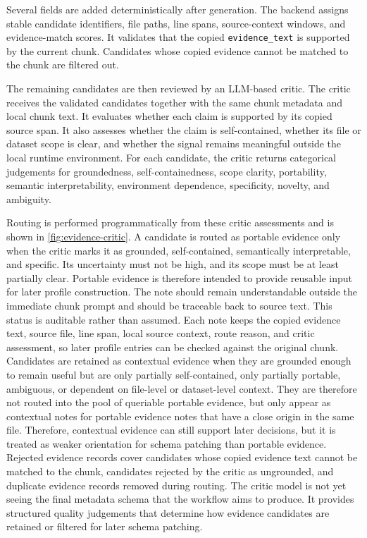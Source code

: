 Several fields are added deterministically after generation.
The backend assigns stable candidate identifiers, file paths, line spans, source-context windows, and evidence-match scores.
It validates that the copied \texttt{evidence\_text} is supported by the current chunk.
Candidates whose copied evidence cannot be matched to the chunk are filtered out.

The remaining candidates are then reviewed by an \ac{LLM}-based critic.
The critic receives the validated candidates together with the same chunk metadata and local chunk text.
It evaluates whether each claim is supported by its copied source span.
It also assesses whether the claim is self-contained, whether its file or dataset scope is clear, and whether the signal remains meaningful outside the local runtime environment.
For each candidate, the critic returns categorical judgements for groundedness, self-containedness, scope clarity, portability, semantic interpretability, environment dependence, specificity, novelty, and ambiguity.

Routing is performed programmatically from these critic assessments and is shown in \cref{fig:evidence-critic}.
A candidate is routed as portable evidence only when the critic marks it as grounded, self-contained, semantically interpretable, and specific.
Its uncertainty must not be high, and its scope must be at least partially clear.
Portable evidence is therefore intended to provide reusable input for later profile construction.
The note should remain understandable outside the immediate chunk prompt and should be traceable back to source text.
This status is auditable rather than assumed.
Each note keeps the copied evidence text, source file, line span, local source context, route reason, and critic assessment, so later profile entries can be checked against the original chunk.
Candidates are retained as contextual evidence when they are grounded enough to remain useful but are only partially self-contained, only partially portable, ambiguous, or dependent on file-level or dataset-level context.
They are therefore not routed into the pool of queriable portable evidence, but only appear as contextual notes for portable evidence notes that have a close origin in the same file.
Therefore, contextual evidence can still support later decisions, but it is treated as weaker orientation for schema patching than portable evidence.
Rejected evidence records cover candidates whose copied evidence text cannot be matched to the chunk, candidates rejected by the critic as ungrounded, and duplicate evidence records removed during routing.
The critic model is not yet seeing the final metadata schema that the workflow aims to produce.
It provides structured quality judgements that determine how evidence candidates are retained or filtered for later schema patching.

